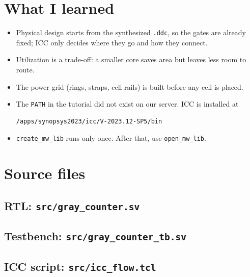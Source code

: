 \documentclass[11pt,a4paper]{article}
\begin{document}
\section{What I learned}
\begin{itemize}
\item Physical design starts from the synthesized \texttt{.ddc}, so the gates are already fixed; ICC only decides where they go and how they connect.
\item Utilization is a trade-off: a smaller core saves area but leaves less room to route.
\item The power grid (rings, straps, cell rails) is built before any cell is placed.
\item The \texttt{PATH} in the tutorial did not exist on our server. ICC is installed at
\begin{lstlisting}[language=bash]
/apps/synopsys2023/icc/V-2023.12-SP5/bin
\end{lstlisting}
\item \texttt{create\_mw\_lib} runs only once. After that, use \texttt{open\_mw\_lib}.
\end{itemize}

\appendix
\section{Source files}
\subsection*{RTL: \texttt{src/gray\_counter.sv}}

\subsection*{Testbench: \texttt{src/gray\_counter\_tb.sv}}

\subsection*{ICC script: \texttt{src/icc\_flow.tcl}}

\end{document}
